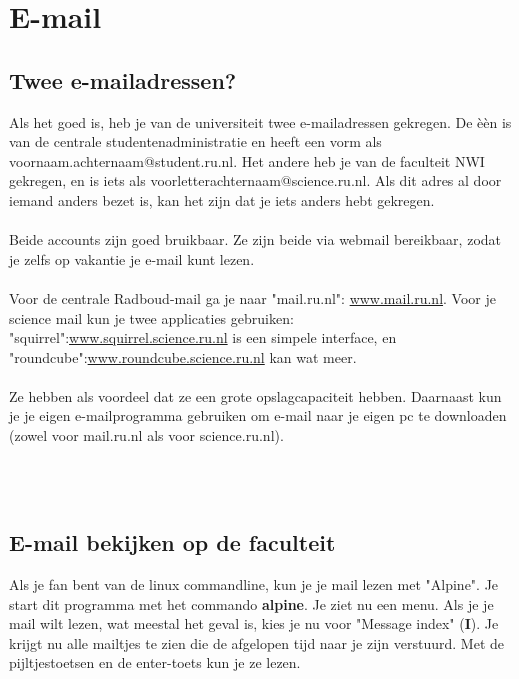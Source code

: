 \section{E-mail}
\subsection{Twee e-mailadressen?}

Als het goed is, heb je van de universiteit twee e-mailadressen gekregen. De \`e\`en is van de centrale studentenadministratie en heeft een vorm als voornaam.achternaam@student.ru.nl. Het andere heb je van de faculteit NWI gekregen, en is iets als voorletterachternaam@science.ru.nl. Als dit adres al door iemand anders bezet is, kan het zijn dat je iets anders hebt gekregen.
\\
\\
Beide accounts zijn goed bruikbaar. Ze zijn beide via webmail bereikbaar, zodat je zelfs op vakantie je e-mail kunt lezen.
\\
\\
Voor de centrale Radboud-mail ga je naar "mail.ru.nl": \href{www.mail.ru.nl}{www.mail.ru.nl}. Voor je science mail kun je twee applicaties gebruiken: "squirrel":\href{www.squirrel.science.ru.nl}{www.squirrel.science.ru.nl} is een simpele interface, en "roundcube":\href{www.roundcube.science.ru.nl}{www.roundcube.science.ru.nl} kan wat meer.
\\
\\
Ze hebben als voordeel dat ze een grote opslagcapaciteit hebben. Daarnaast kun je je eigen e-mailprogramma gebruiken om e-mail naar je eigen pc te downloaden (zowel voor mail.ru.nl als voor science.ru.nl).

\\
\\
\subsection{E-mail bekijken op de faculteit}

Als je fan bent van de linux commandline, kun je je mail lezen met "Alpine". Je start dit programma met het commando \textbf{alpine}. Je ziet nu een menu. Als je je mail wilt lezen, wat meestal het geval is, kies je nu voor "Message index" (\textbf{I}). Je krijgt nu alle mailtjes te zien die de afgelopen tijd naar je zijn verstuurd. Met de pijltjestoetsen en de enter-toets kun je ze lezen.
\\
\\

